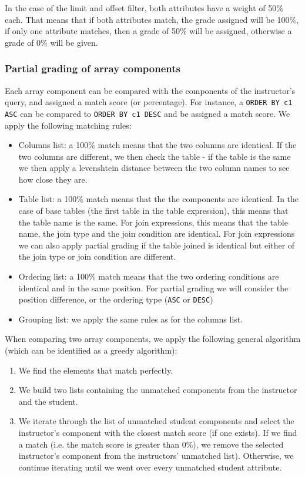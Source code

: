 In the case of the limit and offset filter, both attributes have a weight of 50\% each. That means that if both attributes match, the grade assigned will be 100\%, if only one attribute matches, then a grade of 50\% will be assigned, otherwise a grade of 0\% will be given.

\subsubsection{Partial grading of array components}

Each array component can be compared with the components of the instructor's query, and assigned a match score (or percentage). For instance, a \texttt{ORDER BY c1 ASC} can be compared to \texttt{ORDER BY c1 DESC} and be assigned a match score. We apply the following matching rules:

\begin{itemize}
    \item Columns list: a 100\% match means that the two columns are identical. If the two columns are different, we then check the table - if the table is the same we then apply a levenshtein distance between the two column names to see how close they are.
    \item Table list: a 100\% match means that the the components are identical. In the case of base tables (the first table in the table expression), this means that the table name is the same. For join expressions, this means that the table name, the join type and the join condition are identical. For join expressions we can also apply partial grading if the table joined is identical but either of the join type or join condition are different.
    \item Ordering list: a 100\% match means that the two ordering conditions are identical and in the same position. For partial grading we will consider the position difference, or the ordering type (\texttt{ASC} or \texttt{DESC})
    \item Grouping list: we apply the same rules as for the columns list.
\end{itemize}


When comparing two array components, we apply the following general algorithm (which can be identified as a greedy algorithm):
\begin{enumerate}
    \item We find the elements that match perfectly.
    \item We build two lists containing the unmatched components from the instructor and the student.
    \item We iterate through the list of unmatched student components and select the instructor's component with the closest match score (if one exists). If we find a match (i.e. the match score is greater than 0\%), we remove the selected instructor's component from the instructors' unmatched list). Otherwise, we continue iterating until we went over every unmatched student attribute.
\end{enumerate}

